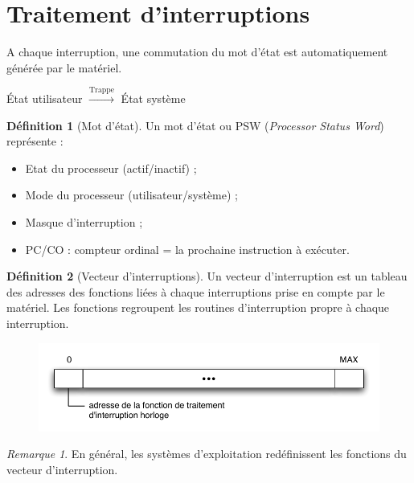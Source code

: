 \documentclass[11pt,english,french]{scrreprt}
\theoremstyle{remark}
\newtheorem*{rem*}{Remarque}
\theoremstyle{definition}
\newtheorem*{def*}{Définition}
\begin{document}
\section{Traitement d'interruptions} %
A chaque interruption, une commutation du mot d'état est automatiquement générée par le matériel.

État utilisateur $\overset{\mathrm{Trappe}}{\longrightarrow}$ État système

\begin{def*}[Mot d'état]
	Un mot d'état ou PSW (\emph{Processor Status Word}) représente :\begin{itemize}
		\item Etat du processeur (actif/inactif) ;
		\item Mode du processeur (utilisateur/système) ;
		\item Masque d'interruption ;
		\item PC/CO : compteur ordinal = la prochaine instruction à exécuter.
	\end{itemize}
\end{def*}

\begin{def*}[Vecteur d'interruptions]
	Un vecteur d'interruption est un tableau des adresses des fonctions liées à chaque interruptions prise en compte par le matériel. Les fonctions regroupent les routines d'interruption propre à chaque interruption.
\end{def*}

\begin{figure}[h!]
	\center
	\vspace{-15pt}
	\includegraphics[scale=.6]{img/vecteur-interruptions}
	\vspace{-15pt}
\end{figure}


\begin{rem*}
	En général, les systèmes d'exploitation redéfinissent les fonctions du vecteur d'interruption.
\end{rem*}
\end{document}
